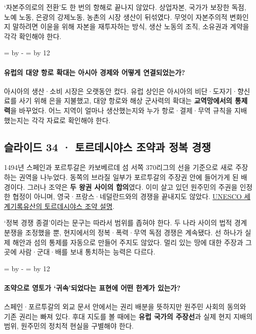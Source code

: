 \documentclass[10pt,a4paper]{article}
\newcommand{\ReserveQuestionSpace}{%
  \par\begingroup
  \dimen0=\pagegoal \advance\dimen0 by -\pagetotal
  \dimen2=\baselineskip \multiply\dimen2 by 12
  \ifdim\dimen0<\dimen2 \newpage\fi
  \endgroup}
\begin{document}
‘자본주의로의 전환’도 한 번의 항해로 끝나지 않았다. 상업자본, 국가가 보장한 독점, 노예 노동, 은광의 강제노동, 농촌의 시장 생산이 뒤섞였다. 무엇이 자본주의적 변화인지 말하려면 이윤을 위해 자본을 재투자하는 방식, 생산 노동의 조직, 소유권과 계약을 각각 확인해야 한다.\par

\ReserveQuestionSpace
\paragraph{유럽의 대양 항로 확대는 아시아 경제와 어떻게 연결되었는가?}
아시아의 생산·소비 시장은 오랫동안 컸다. 유럽 상인은 아시아의 비단·도자기·향신료를 사기 위해 은을 지불했고, 대양 항로와 해상 군사력의 확대는 \textbf{교역망에서의 통제력}을 바꾸었다. 어느 지역이 얼마나 생산했는지와 누가 항로·결제·무역 규칙을 지배했는지는 각각 자료로 확인해야 한다.\par

\subsection{슬라이드 34 · 토르데시야스 조약과 정복 경쟁}
1494년 스페인과 포르투갈은 카보베르데 섬 서쪽 370리그의 선을 기준으로 새로 주장하는 권역을 나누었다. 동쪽의 브라질 일부가 포르투갈의 주장권 안에 들어가게 된 배경이다. 그러나 조약은 \textbf{두 왕권 사이의 합의}였다. 이미 살고 있던 원주민의 주권을 인정한 협정이 아니며, 영국·프랑스·네덜란드와의 경쟁을 끝내지도 않았다. \href{https://www.unesco.org/es/memory-world/treaty-tordesillas}{UNESCO 세계기록유산의 토르데시야스 조약 설명}.\par

‘정복 경쟁 종결’이라는 문구는 따라서 범위를 좁혀야 한다. 두 나라 사이의 법적 경계 분쟁을 조정했을 뿐, 현지에서의 정복·폭력·무역 독점 경쟁은 계속됐다. 선 하나가 실제 해안과 섬의 통제를 자동으로 만들어 주지도 않았다. 멀리 있는 땅에 대한 주장과 그곳에 사람·군대·배를 보내 통치하는 능력은 다르다.\par

\ReserveQuestionSpace
\paragraph{조약으로 영토가 ‘귀속’되었다는 표현에 어떤 한계가 있는가?}
스페인·포르투갈의 외교 문서 안에서는 권리 배분을 뜻하지만 원주민 사회의 동의와 기존 권리는 빠져 있다. 후대 지도를 볼 때에는 \textbf{유럽 국가의 주장선}과 실제 현지 지배의 범위, 원주민의 정치적 현실을 구별해야 한다.\par
\end{document}
